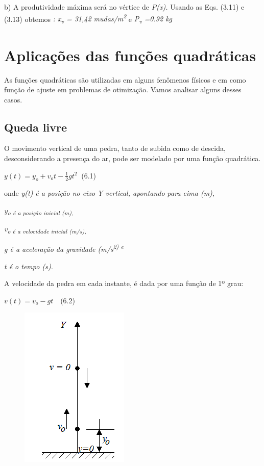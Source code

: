 \begin{texemplo}
	b) A produtividade máxima será no vértice de\textit{ P(x). }Usando as Eqs. (3.11) e (3.13) obtemos\textit{ : x\textsubscript{v} = 31,42 mudas/m\textsuperscript{2} }e\textit{  P\textsubscript{v} =0.92 kg }\qedsymbol{}
\end{texemplo}

\section{Aplicações das funções quadráticas}

As funções quadráticas são utilizadas em alguns fenômenos físicos e em como função de ajuste em problemas de otimização. Vamos analisar alguns desses casos.

\subsection{Queda livre}

O movimento vertical de uma pedra, tanto de subida como de descida, desconsiderando a presença do ar, pode ser modelado por uma função quadrática. 

 \( y \left( t \right) =y_{o}+v_{o}t-\frac{1}{2}gt^{2}~  \) \tab (6.1)

onde \textit{y(t)  é a posição no eixo Y vertical, apontando para cima (m), }

\textit{ y\textsubscript{o  é a posição inicial (m), }}

\textit{v\textsubscript{o  é a velocidade inicial (m/s), }}

\textit{g é a aceleração da gravidade (m/s\textsuperscript{2) e }}

\textit{t é o tempo (s).}

A velocidade da pedra em cada instante, é dada por uma função de 1º grau:

 \( v \left( t \right) =v_{o}-gt~~~  \) \tab (6.2)

\begin{figure}[H]
	\begin{Center}
		\includegraphics[width=2.03in,height=3.05in]{capitulos/funcao_do_segundo_grau/media/image18.png}
	\end{Center}
\end{figure}

